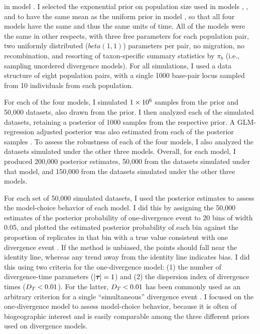 in model \modelOld.
I selected the exponential prior on population size used in models \modelDPP,
\modelUniform, and \modelUniform to have the same mean as the uniform prior in
model \modelOld, so that all four models have the same  and thus the
same units of time.
All of the models were the same in other respects, with three free \myTheta{}
parameters for each population pair, two uniformly distributed ($beta(1,1)$)
\bottleScalar{}{} parameters per pair, no migration, no recombination, and
resorting of taxon-specific summary statistics by $\pi_b$ (i.e., sampling
unordered divergence models).
For all simulations, I used a data structure of eight population pairs, with a
single 1000 base-pair locus sampled from 10 individuals from each population.

For each of the four models, I simulated $1\times 10^{6}$ samples from the prior and
50,000 datasets, also drawn from the prior.
I then analyzed each of the simulated datasets, retaining a
posterior of 1000 samples from the respective prior.
A GLM-regression adjusted posterior was also estimated from each of the
posterior samples \cite{Leuenberger2010}.
To assess the robustness of each of the four models, I also analyzed the
datasets simulated under the other three models.
Overall, for each model, I produced 200,000 posterior estimates,
50,000 from the datasets simulated under that model,
and 150,000 from the datasets simulated under the
other three models.

For each set of 50,000 simulated datasets, I used the posterior estimates
to assess the model-choice behavior of each model.
I did this by assigning the 50,000 estimates of the posterior probability
of one-divergence event to 20 bins of width 0.05, and plotted
the estimated posterior probability of each bin against the proportion of
replicates in that bin with a true value consistent with one divergence
event \cite{Huelsenbeck2004,Oaks2012}.
If the method is unbiased, the points should fall near the identity line,
whereas any trend away from the identity line indicates bias.
I did this using two criteria for the one-divergence model:
(1) the number of divergence-time parameters ($\lvert \boldsymbol{\tau_{}} \rvert = 1$) and
(2) the dispersion index of divergence times ($D_{T_{}} < 0.01$).
For the latter, $D_{T_{}} < 0.01$ has been commonly used as an
arbitrary criterion for a single ``simultaneous'' divergence event
\cite[e.g.,]{Hickerson2006,Leache2007,Stone2012}.
I focused on the one-divergence model to assess model-choice behavior, because
it is often of biogeographic interest and is easily comparable among
the three different priors used on divergence models.

